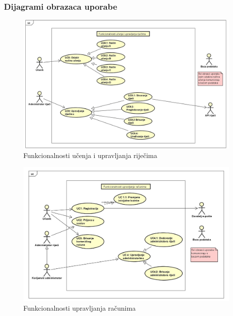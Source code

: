 					
					\subsubsection{Dijagrami obrazaca uporabe}
					
					\begin{figure}[H]
						\includegraphics[scale=0.30]{dijagrami/dijagram1.jpg} 
						\centering
						\caption{Funkcionalnosti učenja i upravljanja riječima}
						\label{fig:dijagram1}
					\end{figure}
					
					\begin{figure}[H]
						\includegraphics[scale=0.35]{dijagrami/dijagram2.jpg} 
						\centering
						\caption{Funkcionalnosti upravljanja računima}
						\label{fig:dijagram2}
					\end{figure}
					
